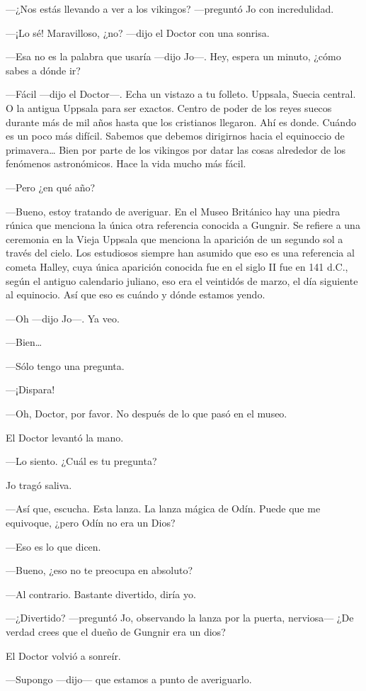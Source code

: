 ---¿Nos estás llevando a ver a los vikingos? ---preguntó Jo con
incredulidad.

---¡Lo sé! Maravilloso, ¿no? ---dijo el Doctor con una sonrisa.

---Esa no es la palabra que usaría ---dijo Jo---. Hey, espera un minuto,
¿cómo sabes a dónde ir?

---Fácil ---dijo el Doctor---. Echa un vistazo a tu folleto. Uppsala,
Suecia central. O la antigua Uppsala para ser exactos. Centro de poder
de los reyes suecos durante más de mil años hasta que los cristianos
llegaron. Ahí es donde. Cuándo es un poco más difícil. Sabemos que
debemos dirigirnos hacia el equinoccio de primavera\ldots{} Bien por
parte de los vikingos por datar las cosas alrededor de los fenómenos
astronómicos. Hace la vida mucho más fácil.

---Pero ¿en qué año?

---Bueno, estoy tratando de averiguar. En el Museo Británico hay una
piedra rúnica que menciona la única otra referencia conocida a Gungnir.
Se refiere a una ceremonia en la Vieja Uppsala que menciona la aparición
de un segundo sol a través del cielo. Los estudiosos siempre han asumido
que eso es una referencia al cometa Halley, cuya única aparición
conocida fue en el siglo II fue en 141 d.C., según el antiguo calendario
juliano, eso era el veintidós de marzo, el día siguiente al equinocio.
Así que eso es cuándo y dónde estamos yendo.

---Oh ---dijo Jo---. Ya veo.

---Bien\ldots{}

---Sólo tengo una pregunta.

---¡Dispara!

---Oh, Doctor, por favor. No después de lo que pasó en el museo.

El Doctor levantó la mano.

---Lo siento. ¿Cuál es tu pregunta?

Jo tragó saliva.

---Así que, escucha. Esta lanza. La lanza mágica de Odín. Puede que me
equivoque, ¿pero Odín no era un Dios?

---Eso es lo que dicen.

---Bueno, ¿eso no te preocupa en absoluto?

---Al contrario. Bastante divertido, diría yo.

---¿Divertido? ---preguntó Jo, observando la lanza por la puerta,
nerviosa--- ¿De verdad crees que el dueño de Gungnir era un dios?

El Doctor volvió a sonreír.

---Supongo ---dijo--- que estamos a punto de averiguarlo.